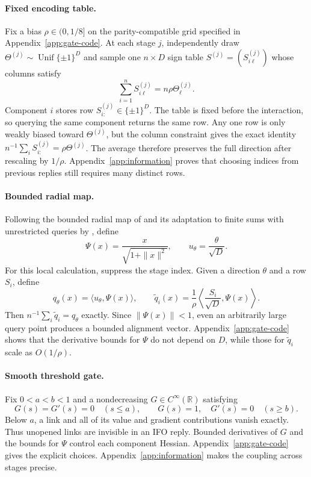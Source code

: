 \documentclass{article}
\newcommand{\R}{\mathbb{R}}
\theoremstyle{definition}
\begin{document}
\paragraph{Fixed encoding table.}
Fix a bias $\rho\in(0,1/8]$ on the parity-compatible grid specified in
Appendix~\ref{app:gate-code}.  At each stage $j$, independently draw
$\Theta^{(j)}\sim\operatorname{Unif}\{\pm1\}^D$ and sample one $n\times D$
sign table $S^{(j)}=(S^{(j)}_{i\ell})$ whose columns satisfy
\begin{equation}
 \sum_{i=1}^n S^{(j)}_{i\ell}=n\rho\Theta^{(j)}_\ell.
 \label{eq:near-balanced}
\end{equation}
Component $i$ stores row $S^{(j)}_{i:}\in\{\pm1\}^D$.  The table is fixed before
the interaction, so querying the same component returns the same row.  Any
one row is only weakly biased toward $\Theta^{(j)}$, but the column constraint
gives the exact identity
$n^{-1}\sum_iS^{(j)}_{i:}=\rho\Theta^{(j)}$.  The average therefore preserves
the full direction after rescaling by $1/\rho$.  Appendix~\ref{app:information} proves
that choosing indices from previous replies still requires many distinct rows.

\paragraph{Bounded radial map.}
Following the bounded radial map of \citet{carmon2020lower1} and its adaptation
to finite sums with unrestricted queries by \citet{emmenegger2022oracle}, define
\begin{equation}
 \Psi(x)=\frac{x}{\sqrt{1+\|x\|^2}},
 \qquad u_\theta=\frac\theta{\sqrt D}.
\end{equation}
For this local calculation, suppress the stage index.  Given a direction
$\theta$ and a row $S_i$, define
\begin{equation}
 q_\theta(x)=\langle u_\theta,\Psi(x)\rangle,
 \qquad
 \widetilde q_i(x)=\frac1\rho
 \left\langle\frac{S_i}{\sqrt D},\Psi(x)\right\rangle.
 \label{eq:radial-hidden-coordinate}
\end{equation}
Then $n^{-1}\sum_i\widetilde q_i=q_\theta$ exactly.  Since $\|\Psi(x)\|<1$,
even an arbitrarily large query point produces a bounded alignment vector.
Appendix~\ref{app:gate-code} shows that the derivative bounds for $\Psi$ do not
depend on $D$, while those for $\widetilde q_i$ scale as $O(1/\rho)$.

\paragraph{Smooth threshold gate.}
Fix $0<a<b<1$ and a nondecreasing $G\in C^\infty(\R)$ satisfying
\begin{equation}
 G(s)=G'(s)=0 \quad(s\le a),
 \qquad
 G(s)=1,\quad G'(s)=0 \quad(s\ge b).
 \label{eq:flat-gate-summary}
\end{equation}
Below $a$, a link and all of its value and gradient contributions vanish
exactly.  Thus unopened links are invisible in an IFO reply.  Bounded
derivatives of $G$ and the bounds for $\Psi$ control each component Hessian.
Appendix~\ref{app:gate-code} gives the explicit choices.
Appendix~\ref{app:information} makes the coupling across stages precise.
\end{document}
